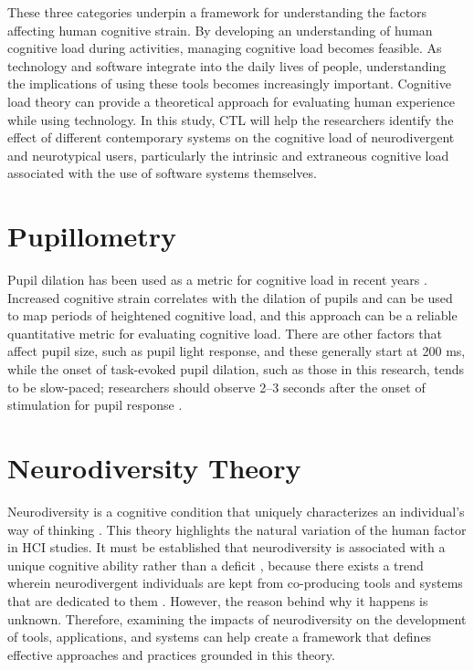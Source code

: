 These three categories underpin a framework for understanding the factors affecting human cognitive strain. By developing an understanding of human cognitive load during activities, managing cognitive load becomes feasible. As technology and software integrate into the daily lives of people, understanding the implications of using these tools becomes increasingly important. Cognitive load theory can provide a theoretical approach for evaluating human experience while using technology. In this study, CTL will help the researchers identify the effect of different contemporary systems on the cognitive load of neurodivergent and neurotypical users, particularly the intrinsic and extraneous cognitive load associated with the use of software systems themselves.


\section{Pupillometry}
Pupil dilation has been used as a metric for cognitive load in recent years \cite{souchet2022, vilotijevic2022, castanheira2021}. Increased cognitive strain correlates with the dilation of pupils and can be used to map periods of heightened cognitive load, and this approach can be a reliable quantitative metric for evaluating cognitive load. There are other factors that affect pupil size, such as pupil light response, and these generally start at 200 ms, while the onset of task-evoked pupil dilation, such as those in this research, tends to be slow-paced; researchers should observe 2–3 seconds after the onset of stimulation for pupil response \cite{mathot2022}.

\section{Neurodiversity Theory}
Neurodiversity is a cognitive condition that uniquely characterizes an individual’s way of thinking \cite{baumer2021, childmind2025}. This theory highlights the natural variation of the human factor in HCI studies. It must be established that neurodiversity is associated with a unique cognitive ability rather than a deficit \cite{aldersonday2023}, because there exists a trend wherein neurodivergent individuals are kept from co-producing tools and systems that are dedicated to them \cite{burtscher2024, le2024, baumer2021, spiel2022, stefanidi2022}. However, the reason behind why it happens is unknown. Therefore, examining the impacts of neurodiversity on the development of tools, applications, and systems can help create a framework that defines effective approaches and practices grounded in this theory. 
 

